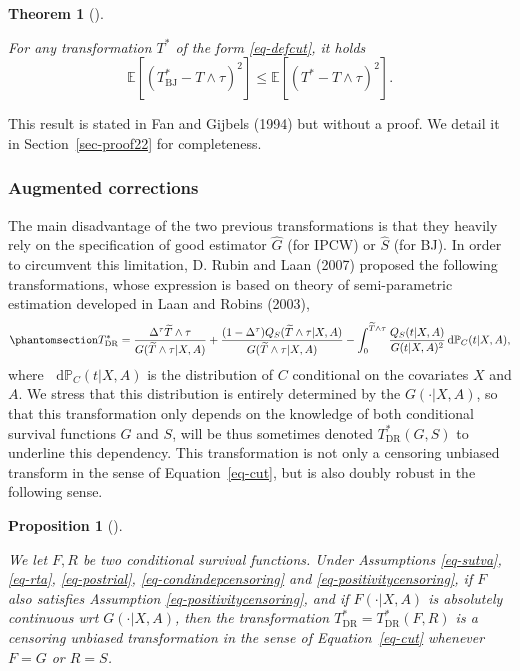 \documentclass[
  11pt,
  a4paper,
]{article}
\theoremstyle{plain}
\newtheorem{theorem}{Theorem}[section]
\theoremstyle{plain}
\theoremstyle{plain}
\newtheorem{proposition}{Proposition}[section]
\theoremstyle{definition}
\theoremstyle{remark}
\begin{document}
\begin{theorem}[]\protect\hypertarget{thm-bj}{}\label{thm-bj}

For any transformation \(T^*\) of the form \ref{eq-defcut}, it holds \[
\mathbb{E}[(T^*_{\mathrm{BJ}}-T \wedge \tau)^2] \leqslant\mathbb{E}[(T^*-T \wedge \tau)^2].
\]

\end{theorem}

This result is stated in Fan and Gijbels (1994) but without a proof. We
detail it in Section~\ref{sec-proof22} for completeness.

\subsubsection{Augmented corrections}\label{sec-tdr}

The main disadvantage of the two previous transformations is that they
heavily rely on the specification of good estimator \(\widehat G\) (for
IPCW) or \(\widehat S\) (for BJ). In order to circumvent this
limitation, D. Rubin and Laan (2007) proposed the following
transformations, whose expression is based on theory of semi-parametric
estimation developed in Laan and Robins (2003),\\
\begin{equation}\phantomsection\label{eq-TDR}{
T^*_\mathrm{DR} = \frac{\Delta^\tau \widetilde T\wedge \tau}{G(\widetilde T \wedge \tau|X,A)} + \frac{(1-\Delta^\tau)Q_S(\widetilde T \wedge \tau |X,A)}{G(\widetilde T \wedge \tau |X,A)}- \int_0^{\widetilde T \wedge \tau} \frac{Q_S(t|X,A)}{G(t|X,A)^2} \mathop{}\!\mathrm{d}\mathbb{P}_C(t|X,A),
}\end{equation} where \(\mathop{}\!\mathrm{d}\mathbb{P}_C(t|X,A)\) is
the distribution of \(C\) conditional on the covariates \(X\) and \(A\).
We stress that this distribution is entirely determined by the
\(G(\cdot|X,A)\), so that this transformation only depends on the
knowledge of both conditional survival functions \(G\) and \(S\), will
be thus sometimes denoted \(T^*_\mathrm{DR}(G,S)\) to underline this
dependency. This transformation is not only a censoring unbiased
transform in the sense of Equation~\ref{eq-cut}, but is also doubly
robust in the following sense.

\begin{proposition}[]\protect\hypertarget{prp-tdr}{}\label{prp-tdr}

We let \(F,R\) be two conditional survival functions. Under Assumptions
\ref{eq-sutva}, \ref{eq-rta}, \ref{eq-postrial}, \ref{eq-condindepcensoring}
and \ref{eq-positivitycensoring}, if \(F\) also satisfies Assumption
\ref{eq-positivitycensoring}, and if \(F(\cdot|X,A)\) is absolutely
continuous wrt \(G(\cdot|X,A)\), then the transformation
\(T^*_\mathrm{DR} = T^*_\mathrm{DR}(F,R)\) is a censoring unbiased
transformation in the sense of Equation~\ref{eq-cut} whenever \(F = G\)
or \(R=S\).

\end{proposition}
\end{document}
